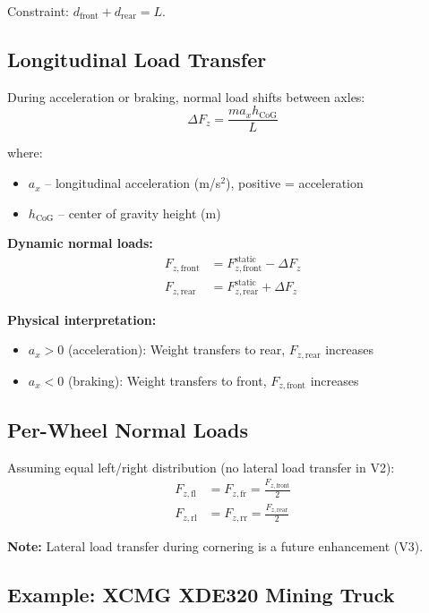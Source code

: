 \documentclass[11pt,a4paper]{article}
\begin{document}
Constraint: $d_{\text{front}} + d_{\text{rear}} = L$.

\subsection{Longitudinal Load Transfer}

During acceleration or braking, normal load shifts between axles:
\begin{equation}
\Delta F_z = \frac{m a_x h_{\text{CoG}}}{L}
\end{equation}

where:
\begin{itemize}
    \item $a_x$ -- longitudinal acceleration (m/s$^2$), positive = acceleration
    \item $h_{\text{CoG}}$ -- center of gravity height (m)
\end{itemize}

\textbf{Dynamic normal loads:}
\begin{align}
F_{z,\text{front}} &= F_{z,\text{front}}^{\text{static}} - \Delta F_z \\
F_{z,\text{rear}} &= F_{z,\text{rear}}^{\text{static}} + \Delta F_z
\end{align}

\textbf{Physical interpretation:}
\begin{itemize}
    \item $a_x > 0$ (acceleration): Weight transfers to rear, $F_{z,\text{rear}}$ increases
    \item $a_x < 0$ (braking): Weight transfers to front, $F_{z,\text{front}}$ increases
\end{itemize}

\subsection{Per-Wheel Normal Loads}

Assuming equal left/right distribution (no lateral load transfer in V2):
\begin{align}
F_{z,\text{fl}} &= F_{z,\text{fr}} = \frac{F_{z,\text{front}}}{2} \\
F_{z,\text{rl}} &= F_{z,\text{rr}} = \frac{F_{z,\text{rear}}}{2}
\end{align}

\textbf{Note:} Lateral load transfer during cornering is a future enhancement (V3).

\subsection{Example: XCMG XDE320 Mining Truck}
\end{document}
